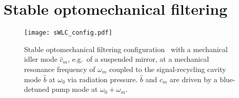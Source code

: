 \section{Stable optomechanical filtering}
\label{sec:sWLC}

\begin{figure}[ht]
	\centering
	\texttt{[image: sWLC\_config.pdf]}
	\caption{Stable optomechanical filtering configuration~\cite{liEnhancingInterferometerSensitivity2021} with a mechanical idler mode $\hat{c}_m$, e.g.\ of a suspended mirror, at a mechanical resonance frequency of $\omega_m$ coupled to the signal-recycling cavity mode $\hat b$ at $\omega_0$ via radiation pressure. $\hat b$ and $\hat{c}_m$ are driven by a blue-detuned pump mode at $\omega_0+\omega_m$.}
	\label{fig:sWLC_config}
\end{figure}


